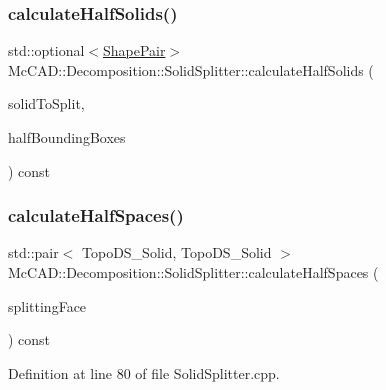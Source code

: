 \subsubsection{\texorpdfstring{calculate\+Half\+Solids()}{calculateHalfSolids()}\hspace{0.1cm}{\footnotesize\ttfamily [2/2]}}
{\footnotesize\ttfamily std\+::optional$<$\hyperlink{classMcCAD_1_1Decomposition_1_1SolidSplitter_a6d92618f3790cfc7403c6f421bd66411}{Shape\+Pair}$>$ Mc\+C\+A\+D\+::\+Decomposition\+::\+Solid\+Splitter\+::calculate\+Half\+Solids (\begin{DoxyParamCaption}\item[{const Topo\+D\+S\+\_\+\+Solid \&}]{solid\+To\+Split,  }\item[{const \hyperlink{classMcCAD_1_1Decomposition_1_1SolidSplitter_a6d92618f3790cfc7403c6f421bd66411}{Shape\+Pair} \&}]{half\+Bounding\+Boxes }\end{DoxyParamCaption}) const\hspace{0.3cm}{\ttfamily [private]}}

\mbox{\label{classMcCAD_1_1Decomposition_1_1SolidSplitter_a30fbfd5f3829a840d6cbe4d50f71fa00}} 
\subsubsection{\texorpdfstring{calculate\+Half\+Spaces()}{calculateHalfSpaces()}\hspace{0.1cm}{\footnotesize\ttfamily [1/2]}}
{\footnotesize\ttfamily std\+::pair$<$ Topo\+D\+S\+\_\+\+Solid, Topo\+D\+S\+\_\+\+Solid $>$ Mc\+C\+A\+D\+::\+Decomposition\+::\+Solid\+Splitter\+::calculate\+Half\+Spaces (\begin{DoxyParamCaption}\item[{const Topo\+D\+S\+\_\+\+Face \&}]{splitting\+Face }\end{DoxyParamCaption}) const\hspace{0.3cm}{\ttfamily [private]}}



Definition at line 80 of file Solid\+Splitter.\+cpp.


